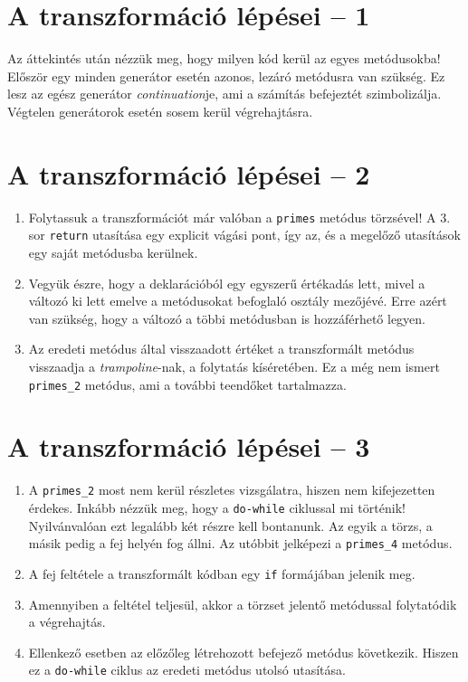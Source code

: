\documentclass[12pt, a4paper]{article}
\begin{document}
\section{A transzformáció lépései -- 1}

Az áttekintés után nézzük meg, hogy milyen kód kerül az egyes metódusokba! Először egy minden generátor esetén azonos, lezáró metódusra van szükség. Ez lesz az egész generátor \textit{continuation}je, ami a számítás befejeztét szimbolizálja. Végtelen generátorok esetén sosem kerül végrehajtásra.

\section{A transzformáció lépései -- 2} 

\begin{enumerate}
    \item
    Folytassuk a transzformációt már valóban a \texttt{primes} metódus törzsével! A 3. sor \texttt{return} utasítása egy explicit vágási pont, így az, és a megelőző utasítások egy saját metódusba kerülnek.
    \item
    Vegyük észre, hogy a deklarációból egy egyszerű értékadás lett, mivel a változó ki lett emelve a metódusokat befoglaló osztály mezőjévé. Erre azért van szükség, hogy a változó a többi metódusban is hozzáférhető legyen.
    \item
    Az eredeti metódus által visszaadott értéket a transzformált metódus visszaadja a \textit{trampoline}-nak, a folytatás kíséretében. Ez a még nem ismert \texttt{primes\_2} metódus, ami a további teendőket tartalmazza.
\end{enumerate}

\section{A transzformáció lépései -- 3}

\begin{enumerate}
    \item
    A \texttt{primes\_2} most nem kerül részletes vizsgálatra, hiszen nem kifejezetten érdekes. Inkább nézzük meg, hogy a \texttt{do-while} ciklussal mi történik! Nyilvánvalóan ezt legalább két részre kell bontanunk. Az egyik a törzs, a másik pedig a fej helyén fog állni. Az utóbbit jelképezi a \texttt{primes\_4} metódus.
    \item
    A fej feltétele a transzformált kódban egy \texttt{if} formájában jelenik meg.
    \item
    Amennyiben a feltétel teljesül, akkor a törzset jelentő metódussal folytatódik a végrehajtás.
    \item
    Ellenkező esetben az előzőleg létrehozott befejező metódus következik. Hiszen ez a \texttt{do-while} ciklus az eredeti metódus utolsó utasítása.
\end{enumerate}
\end{document}
